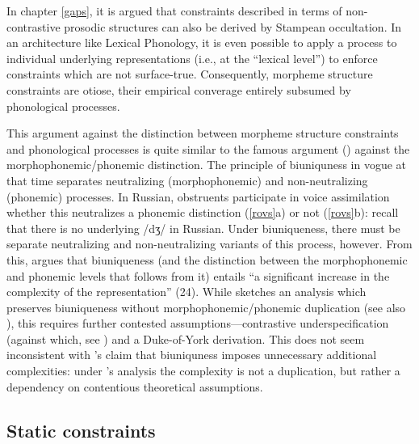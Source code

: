 In chapter \ref{gaps}, it is argued that constraints described in terms of non-contrastive prosodic structures can also be derived by Stampean occultation.
In an architecture like Lexical Phonology, it is even possible to apply a process to individual underlying representations (i.e., at the ``lexical level'') to enforce constraints which are not surface-true.
Consequently, morpheme structure constraints are otiose, their empirical converage entirely subsumed by phonological processes.

This argument against the distinction between morpheme structure constraints and phonological processes is quite similar to the famous argument (\citeyear{SPR}) against the morphophonemic/phonemic distinction.
The principle of biuniquness in vogue at that time separates neutralizing (morphophonemic) and non-neutralizing (phonemic) processes.
In Russian, obstruents participate in voice assimilation whether this neutralizes a phonemic distinction (\ref{rovs}a) or not (\ref{rovs}b): recall that there is no underlying /dʒ/ in Russian.
Under biuniqueness, there must be separate neutralizing and non-neutralizing variants of this process, however.
From this, \citeauthor{SPR} argues that biuniqueness (and the distinction between the morphophonemic and phonemic levels that follows from it) entails ``a significant increase in the complexity of the representation'' (24).
While \citet{Anderson2000} sketches an analysis which preserves biuniqueness without morphophonemic/phonemic duplication (see also \citealt{Kiparsky1985}), this requires further contested assumptions---contrastive underspecification (against which, see \citealt{Steriade1995}) and a Duke-of-York derivation.
This does not seem inconsistent with \citeauthor{SPR}'s claim that biuniquness imposes unnecessary additional complexities: under \citeauthor{Anderson2000}'s analysis the complexity is not a duplication, but rather a dependency on contentious theoretical assumptions.

\subsection{Static constraints}

